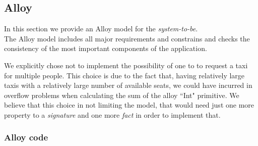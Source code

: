 \newpage
\subsection{Alloy} %
In this section we provide an Alloy model for the \emph{system-to-be}.\\
The Alloy model includes all major requirements and constrains and checks the consistency of the most important components of the application.

We explicitly chose not to implement the possibility of one \emph{} to to request a taxi for multiple people. This choice is due to the fact that, having relatively large taxis with a relatively large number of available seats, we could have incurred in overflow problems when calculating the sum of the alloy ``Int" primitive.
We believe that this choice in not limiting the model, that would need just one more property to a \emph{signature} and one more \emph{fact} in order to implement that.
\newpage

\subsubsection{Alloy code}




